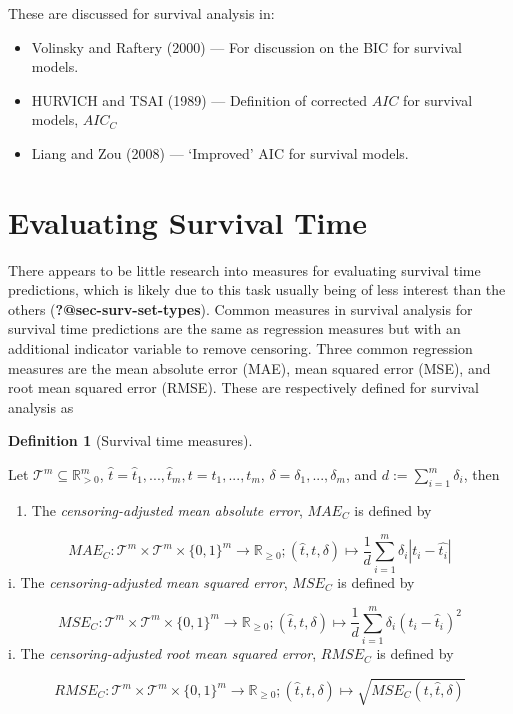 \documentclass[
  letterpaper,
]{scrbook}
\providecommand{\tightlist}{%
  \setlength{\itemsep}{0pt}\setlength{\parskip}{0pt}}\usepackage{longtable,booktabs,array}
\theoremstyle{plain}
\theoremstyle{definition}
\newtheorem{definition}{Definition}[chapter]
\theoremstyle{remark}
\begin{document}
These are discussed for survival analysis in:

\begin{itemize}
\tightlist
\item
  Volinsky and Raftery (2000) --- For discussion on the BIC for survival
  models.
\item
  HURVICH and TSAI (1989) --- Definition of corrected \(AIC\) for
  survival models, \(AIC_C\)
\item
  Liang and Zou (2008) --- `Improved' AIC for survival models.
\end{itemize}

\hypertarget{sec-eval-det}{%
\section{Evaluating Survival Time}\label{sec-eval-det}}

There appears to be little research into measures for evaluating
survival time predictions, which is likely due to this task usually
being of less interest than the others (\textbf{?@sec-surv-set-types}).
Common measures in survival analysis for survival time predictions are
the same as regression measures but with an additional indicator
variable to remove censoring. Three common regression measures are the
mean absolute error (MAE), mean squared error (MSE), and root mean
squared error (RMSE). These are respectively defined for survival
analysis as

\leavevmode{}%
\begin{definition}[Survival time measures]\label{def-survivaltime}

Let \(\mathcal{T}^m \subseteq \mathbb{R}_{>0}^m\),
\(\hat{t}= \hat{t}_1,...,\hat{t}_m, t = t_1,...,t_m\),
\(\delta = \delta_1,...,\delta_m\), and \(d := \sum^m_{i=1} \delta_i\),
then

\begin{enumerate}
\def\labelenumi{\roman{enumi}.}
\tightlist
\item
  The \emph{censoring-adjusted mean absolute error}, \(MAE_C\) is
  defined by
\end{enumerate}

\[
MAE_C: \mathcal{T}^m \times \mathcal{T}^m \times \{0,1\}^m \rightarrow \mathbb{R}_{\geq 0}; (\hat{t}, t, \delta) \mapsto \frac{1}{d} \sum^m_{i=1} \delta_i|t_i - \hat{t_i}|
\] i. The \emph{censoring-adjusted mean squared error}, \(MSE_C\) is
defined by

\[
MSE_C: \mathcal{T}^m \times \mathcal{T}^m \times \{0,1\}^m \rightarrow \mathbb{R}_{\geq 0}; (\hat{t}, t, \delta) \mapsto \frac{1}{d}\sum^m_{i=1}\delta_i(t_i - \hat{t}_i)^2
\] i. The \emph{censoring-adjusted root mean squared error}, \(RMSE_C\)
is defined by

\[
RMSE_C: \mathcal{T}^m \times \mathcal{T}^m \times \{0,1\}^m \rightarrow \mathbb{R}_{\geq 0}; (\hat{t}, t, \delta) \mapsto \sqrt{MSE_C(t, \hat{t}, \delta)}
\]

\end{definition}
\end{document}
